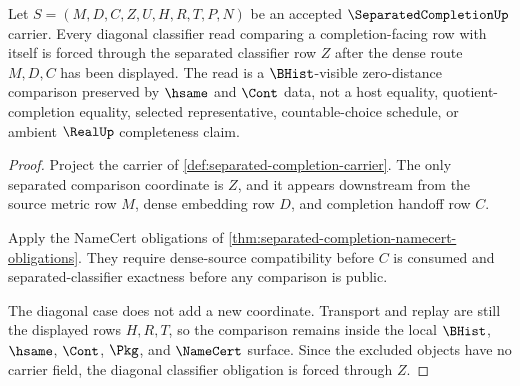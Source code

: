 \begin{theorem}
\label{thm:separatedcompletion-diagonal-classifier-obligation}
Let $S=(M,D,C,Z,U,H,R,T,P,N)$ be an accepted $\SeparatedCompletionUp$ carrier. Every diagonal classifier read comparing a completion-facing row with itself is forced through the separated classifier row $Z$ after the dense route $M,D,C$ has been displayed. The read is a $\BHist$-visible zero-distance comparison preserved by $\hsame$ and $\Cont$ data, not a host equality, quotient-completion equality, selected representative, countable-choice schedule, or ambient $\RealUp$ completeness claim.
\end{theorem}
\begin{proof}
Project the carrier of \autoref{def:separated-completion-carrier}. The only separated comparison coordinate is $Z$, and it appears downstream from the source metric row $M$, dense embedding row $D$, and completion handoff row $C$.

Apply the NameCert obligations of \autoref{thm:separated-completion-namecert-obligations}. They require dense-source compatibility before $C$ is consumed and separated-classifier exactness before any comparison is public.

The diagonal case does not add a new coordinate. Transport and replay are still the displayed rows $H,R,T$, so the comparison remains inside the local $\BHist$, $\hsame$, $\Cont$, $\Pkg$, and $\NameCert$ surface. Since the excluded objects have no carrier field, the diagonal classifier obligation is forced through $Z$.
\end{proof}

